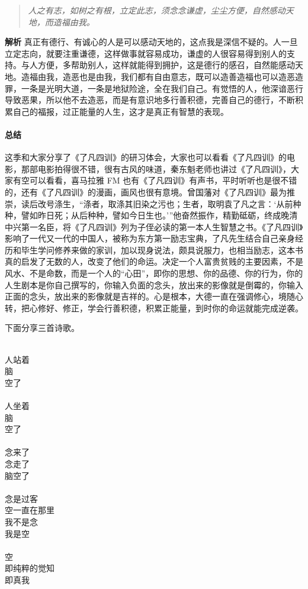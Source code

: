 \begin{quote}\it
    人之有志，如树之有根，立定此志，须念念谦虚，尘尘方便，自然感动天地，而造福由我。
\end{quote}

\textbf{解析} 真正有德行、有诚心的人是可以感动天地的，这点我是深信不疑的。人一旦立定志向，就要注重谦德，这样做事就容易成功，谦虚的人很容易得到别人的支持。与人方便，多帮助别人，这样就能得到拥护，这是德行的感召，自然能感动天地。造福由我，造恶也是由我，我们都有自由意志，既可以造善造福也可以造恶造罪，一条是光明大道，一条是地狱险途，全在我们自己。有觉悟的人，他深谙恶行导致恶果，所以他不去造恶，而是有意识地多行善积德，完善自己的德行，不断积累自己的福报，过正能量的人生，这才是真正有智慧的表现。

\paragraph*{总结}

这季和大家分享了《了凡四训》的研习体会，大家也可以看看《了凡四训》的电影，那部电影拍得很不错，很有古风的味道，秦东魁老师也讲过《了凡四训》，大家有空可以看看，喜马拉雅 FM 也有《了凡四训》有声书，平时听听也是很不错的，还有《了凡四训》的漫画，画风也很有意境。曾国藩对《了凡四训》最为推崇，读后改号涤生，“涤者，取涤其旧染之污也；生者，取明袁了凡之言：‘从前种种，譬如昨日死；从后种种，譬如今日生也。’”他奋然振作，精勤砥砺，终成晚清中兴第一名臣，将《了凡四训》列为子侄必读的第一本人生智慧之书。《了凡四训》影响了一代又一代的中国人，被称为东方第一励志宝典，了凡先生结合自己亲身经历和毕生学问修养来做的家训，加以现身说法，颇具说服力，也相当励志，这本书真的启发了无数的人，改变了他们的命运。决定一个人富贵贫贱的主要因素，不是风水、不是命数，而是一个人的“心田”，即你的思想、你的品德、你的行为，你的人生剧本是你自己撰写的，你输入负面的念头，放出来的影像就是倒霉的，你输入正面的念头，放出来的影像就是吉祥的。心是根本，大德一直在强调修心，境随心转，把心修好、修正，学会行善积德，积累正能量，到时你的命运就能完成逆袭。

下面分享三首诗歌。

\begin{poem}[空]
    \begin{multicols}{5}
        \centering~\\
        人站着 \\ 脑 \\ 空了\\~\\
        人坐着 \\ 脑 \\ 空了\\~\\
        念来了 \\ 念走了 \\ 脑空了 \\~\\
        念是过客 \\ 空一直在那里 \\ 我不是念 \\ 我是空\\~\\
        空 \\ 即纯粹的觉知 \\ 即真我
    \end{multicols}
\end{poem}

